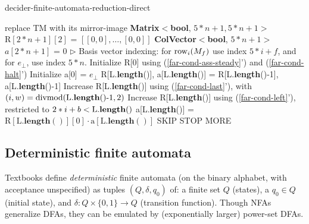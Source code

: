 \begin{algorithm}
  \caption{{\sc decider-finite-automata-reduction-direct}}\label{alg:finite-automata-reduction-direct}

  \begin{algorithmic}[1]
     replace TM with its mirror-image
    \EndIf
    \State \textbf{Matrix$\boldsymbol<$bool}, $5*n+1, 5*n+1\boldsymbol>$ $\textrm{R}[2*n+1][2]$ = $[[0,0],\ldots,[0,0]]$
    \State \textbf{ColVector$\boldsymbol<$bool}, $5*n+1\boldsymbol>$ $a[2*n+1]$ = 0
    \State \(\triangleright\) Basis vector indexing: for $\text{row}_i(M_f)$ use index $5*i+f$, and for $e_\bot$, use index $5*n$.
    \State Initialize R[0] using (\ref{far-cond-ass-steady}') and (\ref{far-cond-halt}')
    \State Initialize a[0] = $e_\bot$
    \State R[L.\textbf{length}()], a[L.\textbf{length}()] = R[L.\textbf{length}()-1], a[L.\textbf{length}()-1]
    \State Increase R[L.\textbf{length}()] using (\ref{far-cond-last}'), with $(i,w)=\operatorname{divmod}(\textrm{L.\textbf{length}()-1}, 2)$
    \Repeat
    \State Increase R[L.\textbf{length}()] using (\ref{far-cond-left}'), restricted to $2*i+b<\textrm{L.\textbf{length}()}$
    \Repeat
    \State a[L.\textbf{length}()] = $\textrm{R}[\textrm{L}.\textbf{length}()][0] \cdot \textrm{a}[\textrm{L}.\textbf{length}()]$
    \Return SKIP
    \Return STOP
    \Else\;\Return MORE
    \EndIf
    \EndProcedure
    \State \Return {}
    \EndProcedure
  \end{algorithmic}
\end{algorithm}

\subsection{Deterministic finite automata}
\label{far-defs-dfa}
Textbooks define \emph{deterministic} finite automata (on the binary alphabet, with acceptance unspecified) as tuples $(Q, \delta, q_0)$ of: a finite set $Q$ (states), a $q_0\in Q$ (initial state), and $\delta: Q\times\{0, 1\}\to Q$ (transition function).
Though NFAs generalize DFAs, they can be emulated by (exponentially larger) power-set DFAs. \cite{Sipser}


